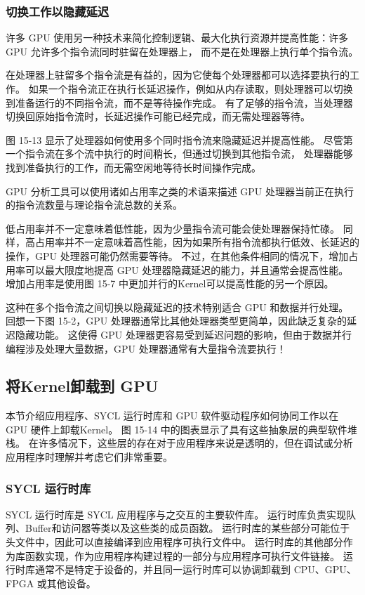 \subsubsection{切换工作以隐藏延迟}
许多 GPU 使用另一种技术来简化控制逻辑、最大化执行资源并提高性能：许多 GPU 允许多个指令流同时驻留在处理器上，
而不是在处理器上执行单个指令流。

在处理器上驻留多个指令流是有益的，因为它使每个处理器都可以选择要执行的工作。 
如果一个指令流正在执行长延迟操作，例如从内存读取，则处理器可以切换到准备运行的不同指令流，而不是等待操作完成。 
有了足够的指令流，当处理器切换回原始指令流时，长延迟操作可能已经完成，而无需处理器等待。

图 15-13 显示了处理器如何使用多个同时指令流来隐藏延迟并提高性能。 
尽管第一个指令流在多个流中执行的时间稍长，但通过切换到其他指令流，
处理器能够找到准备执行的工作，而无需空闲地等待长时间操作完成。

GPU 分析工具可以使用诸如占用率之类的术语来描述 GPU 处理器当前正在执行的指令流数量与理论指令流总数的关系。

低占用率并不一定意味着低性能，因为少量指令流可能会使处理器保持忙碌。 
同样，高占用率并不一定意味着高性能，因为如果所有指令流都执行低效、长延迟的操作，GPU 处理器可能仍然需要等待。 
不过，在其他条件相同的情况下，增加占用率可以最大限度地提高 GPU 处理器隐藏延迟的能力，并且通常会提高性能。 
增加占用率是使用图 15-7 中更加并行的Kernel可以提高性能的另一个原因。

这种在多个指令流之间切换以隐藏延迟的技术特别适合 GPU 和数据并行处理。 
回想一下图 15-2，GPU 处理器通常比其他处理器类型更简单，因此缺乏复杂的延迟隐藏功能。 
这使得 GPU 处理器更容易受到延迟问题的影响，但由于数据并行编程涉及处理大量数据，GPU 处理器通常有大量指令流要执行！

\subsection{将Kernel卸载到 GPU}
本节介绍应用程序、SYCL 运行时库和 GPU 软件驱动程序如何协同工作以在 GPU 硬件上卸载Kernel。 
图 15-14 中的图表显示了具有这些抽象层的典型软件堆栈。 
在许多情况下，这些层的存在对于应用程序来说是透明的，但在调试或分析应用程序时理解并考虑它们非常重要。

\subsubsection{SYCL 运行时库}
SYCL 运行时库是 SYCL 应用程序与之交互的主要软件库。 
运行时库负责实现队列、Buffer和访问器等类以及这些类的成员函数。 
运行时库的某些部分可能位于头文件中，因此可以直接编译到应用程序可执行文件中。 
运行时库的其他部分作为库函数实现，作为应用程序构建过程的一部分与应用程序可执行文件链接。 
运行时库通常不是特定于设备的，并且同一运行时库可以协调卸载到 CPU、GPU、FPGA 或其他设备。

